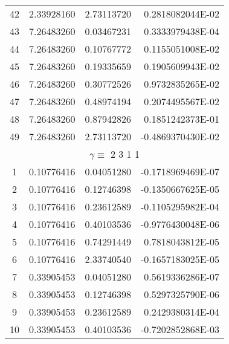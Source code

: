 \begin{longtable}{@{\extracolsep{\fill}}cllr@{}}
42  &  2.33928160  &  2.73113720  &   0.2818082044E-02 \\

43  &  7.26483260  &  0.03467231  &   0.3333979438E-04 \\

44  &  7.26483260  &  0.10767772  &   0.1155051008E-02 \\

45  &  7.26483260  &  0.19335659  &   0.1905609943E-02 \\

46  &  7.26483260  &  0.30772526  &   0.9732835265E-02 \\

47  &  7.26483260  &  0.48974194  &   0.2074495567E-02 \\

48  &  7.26483260  &  0.87942826  &   0.1851242373E-01 \\

49  &  7.26483260  &  2.73113720  &  -0.4869370430E-02 \\

\midrule

\multicolumn{4}{c}{ $\gamma \equiv $  2 3 1 1} \\

\midrule

1  &  0.10776416  &  0.04051280  &  -0.1718969469E-07 \\

2  &  0.10776416  &  0.12746398  &  -0.1350667625E-05 \\

3  &  0.10776416  &  0.23612589  &  -0.1105295982E-04 \\

4  &  0.10776416  &  0.40103536  &  -0.9776430048E-06 \\

5  &  0.10776416  &  0.74291449  &   0.7818043812E-05 \\

6  &  0.10776416  &  2.33740540  &  -0.1657183025E-05 \\

7  &  0.33905453  &  0.04051280  &   0.5619336286E-07 \\

8  &  0.33905453  &  0.12746398  &   0.5297325790E-06 \\

9  &  0.33905453  &  0.23612589  &   0.2429380314E-04 \\

10  &  0.33905453  &  0.40103536  &  -0.7202852868E-03 \\


\end{longtable}
